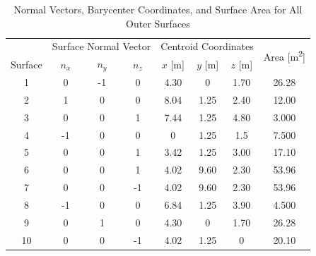 \begin{table}[H]
\centering
\begin{tabular}{c|ccc|ccc|c}
        & \multicolumn{3}{c|}{Surface Normal Vector} & \multicolumn{3}{c|}{Centroid Coordinates} & \multirow{2}{*}{Area [m\textsuperscript{2}]} \\ \cline{2-7}
Surface & $n_x$        & $n_y$        & $n_z$        & $x$ [m]  & $y$ [m]  & $z$ [m] &                                                                   \\ \hline
1       & 0            & -1           & 0            & 4.30         & 0            & 1.70        & 26.28                                                             \\
2       & 1            & 0            & 0            & 8.04         & 1.25         & 2.40        & 12.00                                                             \\
3       & 0            & 0            & 1            & 7.44         & 1.25         & 4.80        & 3.000                                                             \\
4       & -1           & 0            & 0            & 0            & 1.25         & 1.5         & 7.500                                                             \\
5       & 0            & 0            & 1            & 3.42         & 1.25         & 3.00        & 17.10                                                             \\
6       & 0            & 0            & 1            & 4.02         & 9.60         & 2.30        & 53.96                                                             \\
7       & 0            & 0            & -1           & 4.02         & 9.60         & 2.30        & 53.96                                                             \\
8       & -1           & 0            & 0            & 6.84         & 1.25         & 3.90        & 4.500                                                             \\
9       & 0            & 1            & 0            & 4.30         & 0            & 1.70        & 26.28                                                             \\
10      & 0            & 0            & -1           & 4.02         & 1.25         & 0           & 20.10                                                            
\end{tabular}
\caption{Normal Vectors, Barycenter Coordinates, and Surface Area for All Outer Surfaces}
\label{tab:surface_data}
\end{table}

